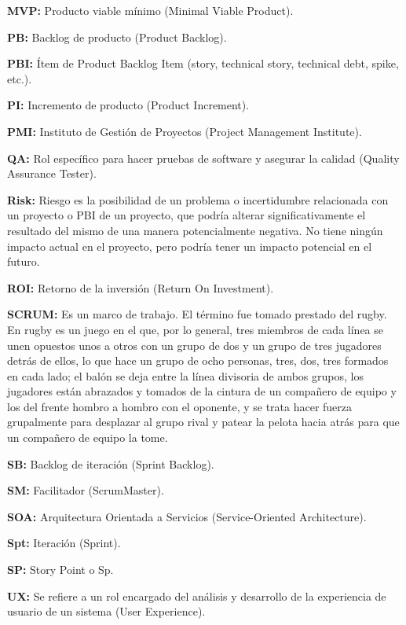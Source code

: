 \begin{description}
  \item {\textbf{MVP:} Producto viable mínimo (Minimal Viable Product).}
  
  \item {\textbf{PB:} Backlog de producto (Product Backlog).}
  
  \item {\textbf{PBI:} Ítem de Product Backlog Item (story, technical story, technical debt, spike, etc.).}
  
  \item {\textbf{PI:} Incremento de producto (Product Increment).}
  
  \item {\textbf{PMI:} Instituto de Gestión de Proyectos (Project Management Institute).}
  
  \item {\textbf{QA:} Rol específico para hacer pruebas de software y asegurar la calidad (Quality Assurance Tester).}
  
  \item {\textbf{Risk:} Riesgo es la posibilidad de un problema o incertidumbre relacionada con un proyecto o PBI de un proyecto, que podría alterar significativamente el resultado del mismo de una manera potencialmente negativa. No tiene ningún impacto actual en el proyecto, pero podría tener un impacto potencial en el futuro.}
  
  \item {\textbf{ROI:} Retorno de la inversión (Return On Investment).}
  
  \item {\textbf{SCRUM:} Es un marco de trabajo. El término fue tomado prestado del rugby. En rugby es un juego en el que, por lo general, tres miembros de cada línea se unen opuestos unos a otros con un grupo de dos y un grupo de tres jugadores detrás de ellos, lo que hace un grupo de ocho personas, tres, dos, tres formados en cada lado; el balón se deja entre la línea divisoria de ambos grupos, los jugadores están abrazados y tomados de la cintura de un compañero de equipo y los del frente hombro a hombro con el oponente, y se trata hacer fuerza grupalmente para desplazar al grupo rival y patear la pelota hacia atrás para que un compañero de equipo la tome.}
  
  \item {\textbf{SB:} Backlog de iteración (Sprint Backlog).}
  
  \item {\textbf{SM:} Facilitador (ScrumMaster).}
  
  \item {\textbf{SOA:} Arquitectura Orientada a Servicios (Service-Oriented Architecture).}
  
  \item {\textbf{Spt:} Iteración (Sprint).}
  
  \item {\textbf{SP:} Story Point o Sp.}
  
  \item {\textbf{UX:} Se refiere a un rol encargado del análisis y desarrollo de la experiencia de usuario de un sistema (User Experience).}
  
\end{description}
  
